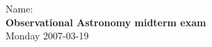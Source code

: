 \documentclass[12pt]{article}
\begin{document}
\noindent
Name:\,\makebox[0.8\textwidth]{\hrulefill} \\
\textbf{Observational Astronomy midterm exam} \\
Monday 2007-03-19 \\
\end{document}
